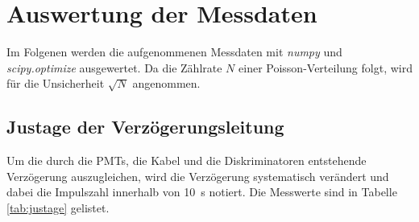 \section{Auswertung der Messdaten}
\label{sec:Auswertung}
Im Folgenen werden die aufgenommenen Messdaten mit \textit{numpy} und \textit{scipy.optimize} ausgewertet. Da die Zählrate $N$ einer Poisson-Verteilung folgt, wird
für die Unsicherheit $\sqrt{N}$ angenommen. 

\subsection{Justage der Verzögerungsleitung}
\label{sec:justage}
Um die durch die PMTs, die Kabel und die Diskriminatoren entstehende Verzögerung auszugleichen, wird die Verzögerung systematisch verändert und dabei die Impulszahl innerhalb von \SI{10}{\second} 
notiert. Die Messwerte sind in Tabelle \ref{tab:justage} gelistet. 
